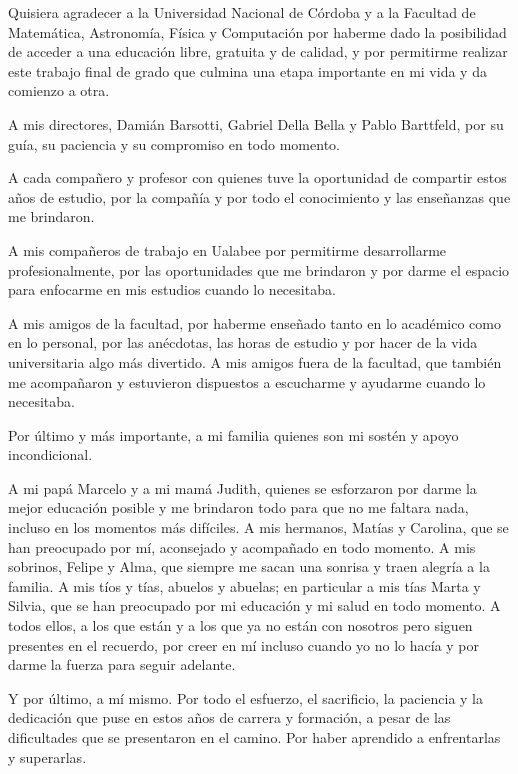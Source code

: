 Quisiera agradecer a la Universidad Nacional de Córdoba y a la Facultad de Matemática, Astronomía, Física y Computación por haberme dado la posibilidad de acceder a una educación libre, gratuita y de calidad, y por permitirme realizar este trabajo final de grado que culmina una etapa importante en mi vida y da comienzo a otra.

A mis directores, Damián Barsotti, Gabriel Della Bella y Pablo Barttfeld, por su guía, su paciencia y su compromiso en todo momento.

A cada compañero y profesor con quienes tuve la oportunidad de compartir estos años de estudio, por la compañía y por todo el conocimiento y las enseñanzas que me brindaron.

A mis compañeros de trabajo en Ualabee por permitirme desarrollarme profesionalmente, por las oportunidades que me brindaron y por darme el espacio para enfocarme en mis estudios cuando lo necesitaba.

A mis amigos de la facultad, por haberme enseñado tanto en lo académico como en lo personal, por las anécdotas, las horas de estudio y por hacer de la vida universitaria algo más divertido.
A mis amigos fuera de la facultad, que también me acompañaron y estuvieron dispuestos a escucharme y ayudarme cuando lo necesitaba.

Por último y más importante, a mi familia quienes son mi sostén y apoyo incondicional.

A mi papá Marcelo y a mi mamá Judith, quienes se esforzaron por darme la mejor educación posible y me brindaron todo para que no me faltara nada, incluso en los momentos más difíciles.
A mis hermanos, Matías y Carolina, que se han preocupado por mí, aconsejado y acompañado en todo momento.
A mis sobrinos, Felipe y Alma, que siempre me sacan una sonrisa y traen alegría a la familia.
A mis tíos y tías, abuelos y abuelas; en particular a mis tías Marta y Silvia, que se han preocupado por mi educación y mi salud en todo momento.
A todos ellos, a los que están y a los que ya no están con nosotros pero siguen presentes en el recuerdo, por creer en mí incluso cuando yo no lo hacía y por darme la fuerza para seguir adelante.

Y por último, a mí mismo. Por todo el esfuerzo, el sacrificio, la paciencia y la dedicación que puse en estos años de carrera y formación, a pesar de las dificultades que se presentaron en el camino. Por haber aprendido a enfrentarlas y superarlas.

